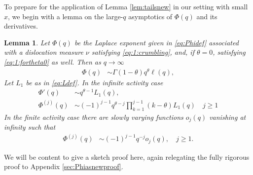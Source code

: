 \documentclass[a4,12pt]{amsart}
\numberwithin{equation}{section}
\newtheorem{lemma}[thm]{Lemma}
\begin{document}

To prepare for the application of Lemma \ref{lem:tailsnew} in our setting with small $x$, we begin with a lemma on the large-$q$ asymptotics of $\Phi(q)$ and its derivatives.



\begin{lemma} \label{lem:Phiasnew}
    Let $\Phi(q)$ be the Laplace exponent given in \eqref{eq:Phidef} associated with a dislocation measure $\nu$ satisfying \eqref{eq:1:crumbling}, and, if $\theta = 0$, satisfying \eqref{eq:1:fortheta0} as well. 
    Then as $q \to \infty$
    \begin{align}
			\Phi(q) & \sim \Gamma(1-\theta) q^\theta \ell(q), \label{eq:Phiasnew}
     \end{align}
    Let $L_1$ be as in \eqref{eq:Ldef}. In the infinite activity case
     \begin{align}
            \Phi'(q) &\sim q^{\theta-1}L_1(q),\label{eq:Phiprimeasnew}\\
            \Phi^{(j)}(q) &\sim (-1)^{j-1} q^{\theta -j } \prod_{k=1}^{j-1}(k-\theta) L_1(q) \quad j \geq 1 \label{eq:Phihighernew}
		\end{align}
        In the finite activity case there are slowly varying functions $o_j(q)$
        vanishing at infinity such that 
        \begin{align}
            \Phi^{(j)}(q) &\sim (-1)^{j-1} q^{-j } o_j(q), \quad j \geq 1. \label{eq:Phihighernew1}
		\end{align}
        \end{lemma}

We will be content to give a sketch proof here, again relegating the fully rigorous proof to Appendix \ref{sec:Phiasnewproof}.
\end{document}
